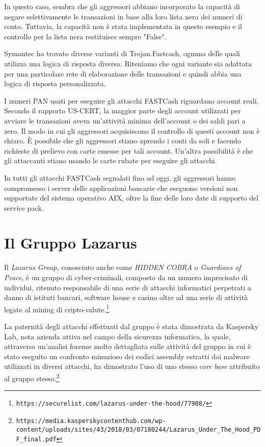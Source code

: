 \documentclass[10pt,a4paper, titlepage]{report}
\begin{document}
In questo caso, sembra che gli aggressori abbiano incorporato la capacità di negare selettivamente le transazioni in base alla loro lista nera dei numeri di conto. Tuttavia, la capacità non è stata implementata in questo esempio e il controllo per la lista nera restituisce sempre "False". 
 
Symantec ha trovato diverse varianti di Trojan.Fastcash, ognuna delle quali utilizza una logica di risposta diversa. Riteniamo che ogni variante sia adattata per una particolare rete di elaborazione delle transazioni e quindi abbia una logica di risposta personalizzata. 
 
I numeri PAN usati per eseguire gli attacchi FASTCash riguardano account reali. Secondo il rapporto US-CERT, la maggior parte degli account utilizzati per avviare le transazioni aveva un'attività minima dell'account o dei saldi pari a zero.  
Il modo in cui gli aggressori acquisiscono il controllo di questi account non è chiaro. È possibile che gli aggressori stiano aprendo i conti da soli e facendo richieste di prelievo con carte emesse per tali account. Un'altra possibilità è che gli attaccanti stiano usando le carte rubate per eseguire gli attacchi. 
 
In tutti gli attacchi FASTCash segnalati fino ad oggi, gli aggressori hanno compromesso i server delle applicazioni bancarie che eseguono versioni non supportate del sistema operativo AIX, oltre la fine delle loro date di supporto del service pack. 
 
\section{Il Gruppo Lazarus}
 
Il \textit{Lazarus Group}, conosciuto anche come \textit{HIDDEN COBRA} o \textit{Guardians of Peace}, è un gruppo di cyber-criminali, composto da un numero imprecisato di individui, ritenuto responsabile di una serie di attacchi informatici perpetrati a danno di istituti bancari, software house e casino oltre ad una serie di attività legate al mining di cripto-valute.\footnote{\texttt{https://securelist.com/lazarus-under-the-hood/77908/}}

La paternità degli attacchi effettuati dal gruppo è stata dimostrata da Kaspersky Lab, nota azienda attiva nel campo della sicurezza informatica, la quale, attraverso un'analisi forense molto dettagliata sulle attività del gruppo in cui è stato eseguito un confronto minuzioso dei codici assembly estratti dai malware utilizzati in diversi attacchi, ha dimostrato l'uso di uno stesso \textit{core base} attribuito al gruppo stesso.\footnote{\texttt{https://media.kasperskycontenthub.com/wp-content/uploads/sites/43/2018/03/07180244/Lazarus\_Under\_The\_Hood\_PDF\_final.pdf}}
\end{document}
